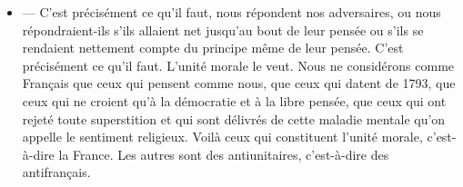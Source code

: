 \documentclass[french,twoside]{book} %
\begin{document}
\begin{itemize}[itemsep=0pt,]
\item  — C’est précisément ce qu’il faut, nous répondent nos adversaires, ou nous répondraient-ils s’ils allaient net jusqu’au bout de leur pensée ou s’ils se rendaient nettement compte du principe même de leur pensée. C’est précisément ce qu’il faut. L’unité morale le veut. Nous ne considérons comme Français que ceux qui pensent comme nous, que ceux qui datent de 1793, que ceux qui ne croient qu’à la démocratie et à la libre pensée, que ceux qui ont rejeté toute superstition et qui sont délivrés de cette maladie mentale qu’on appelle le sentiment religieux. Voilà ceux qui constituent l’unité morale, c’est-à-dire la France. Les autres sont des antiunitaires, c’est-à-dire des antifrançais.
\end{itemize}
\end{document}
